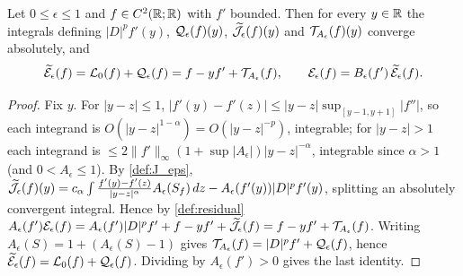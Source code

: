 \begin{lemma}
  \label{lem:c07_divided_residual_identity}
  Let $0\le\epsilon\le1$ and $f\in C^2(\mathbb{R};\mathbb{R})$ with $f'$ bounded. Then for every $y\in\mathbb{R}$ the
  integrals defining $|D|^pf'(y)$, $\mathcal{Q}_\epsilon(f)(y)$, $\widetilde{\mathcal{J}}_\epsilon(f)(y)$ and
  $\mathcal{T}_{A_\epsilon}(f)(y)$ converge absolutely, and
  \[
    \widetilde{\mathcal{E}}_\epsilon(f)=\mathcal{L}_0(f)+\mathcal{Q}_\epsilon(f)=f-yf'+\mathcal{T}_{A_\epsilon}(f),
    \qquad \mathcal{E}_\epsilon(f)=B_\epsilon(f')\,\widetilde{\mathcal{E}}_\epsilon(f).
  \]
\end{lemma}
\begin{proof}
  Fix $y$. For $|y-z|\le1$, $|f'(y)-f'(z)|\le|y-z|\sup_{[y-1,y+1]}|f''|$, so each integrand is
  $O(|y-z|^{1-\alpha})=O(|y-z|^{-p})$, integrable; for $|y-z|>1$ each integrand is
  $\le 2\|f'\|_\infty(1+\sup|A_\epsilon|)|y-z|^{-\alpha}$, integrable since $\alpha>1$ (and
  $0<A_\epsilon\le1$). By \cref{def:J_eps},
  $\widetilde{\mathcal{J}}_\epsilon(f)(y)=c_\alpha\int\frac{f'(y)-f'(z)}{|y-z|^\alpha}A_\epsilon(S_f)\,dz-A_\epsilon(f'(y))|D|^pf'(y)$,
  splitting an absolutely convergent integral. Hence by \cref{def:residual}
  $A_\epsilon(f')\mathcal{E}_\epsilon(f)=A_\epsilon(f')|D|^pf'+f-yf'+\widetilde{\mathcal{J}}_\epsilon(f)=f-yf'+\mathcal{T}_{A_\epsilon}(f)$.
  Writing $A_\epsilon(S)=1+(A_\epsilon(S)-1)$ gives $\mathcal{T}_{A_\epsilon}(f)=|D|^pf'+\mathcal{Q}_\epsilon(f)$, hence
  $\widetilde{\mathcal{E}}_\epsilon(f)=\mathcal{L}_0(f)+\mathcal{Q}_\epsilon(f)$. Dividing by $A_\epsilon(f')>0$ gives the last identity.
\end{proof}

